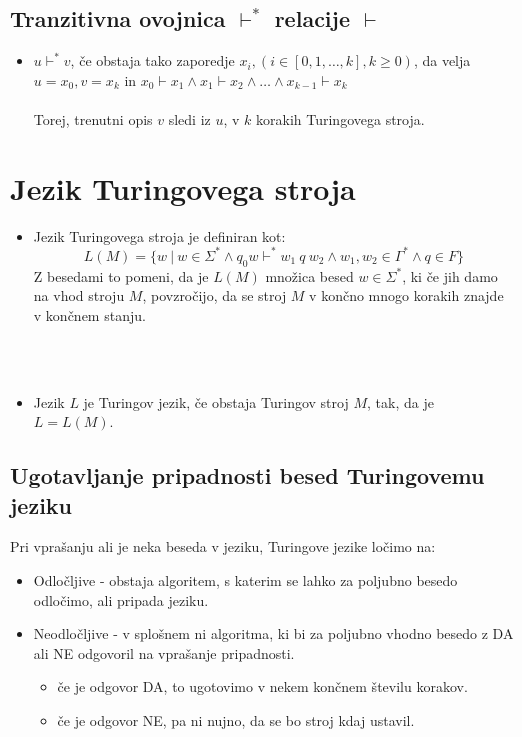 \documentclass[10pt,a4paper,oneside]{book}
\newcommand\Prim{%
    \textbf{Primer: }%
}
\newcommand\br{%
\ \\ \\
}
\newenvironment{items}{
\begin{itemize}
	\setlength{\itemsep}{2pt}
	\setlength{\parskip}{0pt}
	\setlength{\parsep}{0pt}
	\setlength{\topsep}{0pt}
	\setlength{\leftskip}{0.15cm}
}{\end{itemize}}
\newcommand\Def[1]{%
\begin{items}%
	\item[\textbf{Def.:}]{#1}%
\end{items}%
}
\begin{document}
\subsection{Tranzitivna ovojnica $\vdash^*$ relacije $\vdash$}%
\Def{$u \vdash^* v$, če obstaja tako zaporedje $x_i, (i \in [0, 1, \dots, k], k \geq 0)$, da velja $u=x_0, v=x_k$ in $x_0 \vdash x_1 \wedge x_1 \vdash x_2 \wedge \dots \wedge x_{k-1} \vdash x_k$
\br
Torej, trenutni opis $v$ sledi iz $u$, v $k$ korakih Turingovega stroja.}
\section{Jezik Turingovega stroja}
\Def{Jezik Turingovega stroja je definiran kot:
\begin{equation*}
L(M) = \{ w\ |\ w \in \Sigma^* \wedge q_0w \vdash^* w_1\ q\ w_2 \wedge w_1,w_2 \in \Gamma^* \wedge q \in F \}
\end{equation*}
Z besedami to pomeni, da je $L(M)$ množica besed $w \in \Sigma^*$, ki če jih damo na vhod stroju $M$, povzročijo, da se stroj $M$ v končno mnogo korakih znajde v končnem stanju.}
\br
\Def{Jezik $L$ je Turingov jezik, če obstaja Turingov stroj $M$, tak, da je $L = L(M)$.}
\subsection{Ugotavljanje pripadnosti besed Turingovemu jeziku}%
Pri vprašanju ali je neka beseda v jeziku, Turingove jezike ločimo na:
\begin{items}
\item Odločljive - obstaja algoritem, s katerim se lahko za poljubno besedo odločimo, ali pripada jeziku.
\item Neodločljive - v splošnem ni algoritma, ki bi za poljubno vhodno besedo z DA ali NE odgovoril na vprašanje pripadnosti.
	\begin{items}
	\item če je odgovor DA, to ugotovimo v nekem končnem številu korakov.
	\item če je odgovor NE, pa ni nujno, da se bo stroj kdaj ustavil.
	\end{items}
\end{items}
\br
\br
\br
\br
\end{document}

